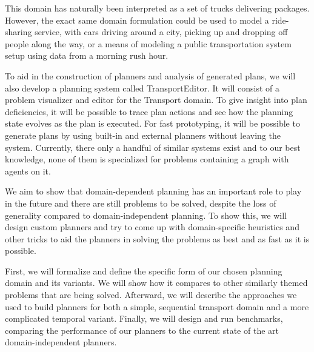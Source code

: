 This domain has naturally been interpreted as a set of trucks
delivering packages. However,
the exact same domain formulation could be used to
model a ride-sharing service, with cars driving around a city, picking up and dropping off people along the way, or
a means of modeling a public transportation system setup using
data from a morning rush hour.

To aid in the construction of planners and analysis of generated
plans, we will also develop a planning system called TransportEditor. It will consist of a problem visualizer and editor for the Transport domain. To give insight into plan deficiencies, it will be possible to trace plan actions and see how the planning
state evolves as the plan is executed. For fast prototyping,
it will be possible to generate plans by using built-in and external planners without leaving the system. Currently, there only a handful of similar systems exist and to our best knowledge, none of them is specialized for problems containing a graph with
agents on it.

We aim to show that domain-dependent planning has an important
role to play in the future and there are still problems to be solved, despite the loss of generality compared to domain-independent planning.
To show this, we will design custom planners
and try to come up with domain-specific heuristics and other tricks
to aid the planners in solving the problems as best and as fast as
it is possible.

First, we will formalize and define the specific form of our
chosen planning domain and its variants. We will show how
it compares to other similarly themed problems that are being
solved. Afterward, we will describe the approaches we used
to build planners for both a
simple, sequential transport domain and a more complicated
temporal variant. Finally, we will design and run benchmarks,
comparing the performance of our planners to the current
state of the art domain-independent planners.
